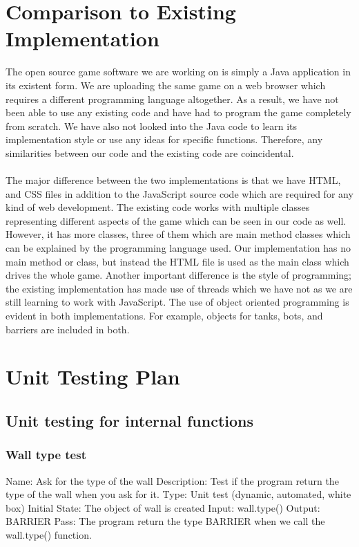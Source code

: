\documentclass{article}
\begin{document}
\section{Comparison to Existing Implementation}
The open source game software we are working on is simply a Java application 
in its existent form. We are uploading the same game on a web browser which 
requires a different programming language altogether. As a result, we have not 
been able to use any existing code and have had to program the game completely 
from scratch. We have also not looked into the Java code to learn its 
implementation style or use any ideas for specific functions. Therefore, any 
similarities between our code and the existing code are coincidental. \\ \\
The major difference between the two implementations is that we have HTML, and 
CSS files in addition to the JavaScript source code which are required for any 
kind of web development. The existing code works with multiple classes 
representing different aspects of the game which can be seen in our code as 
well. However, it has more classes, three of them which are main method 
classes which can be explained by the programming language used. Our 
implementation has no main method or class, but instead the HTML file is used 
as the main class which drives the whole game. Another important difference is 
the style of programming; the existing implementation has made use of threads 
which we have not as we are still learning to work with JavaScript. The use of 
object oriented programming is evident in both implementations. For example, 
objects for tanks, bots, and barriers are included in both. 





\section{Unit Testing Plan}
\subsection{Unit testing for internal functions}
\subsubsection{Wall type test}
Name:  Ask for the type of the wall\newline
Description: Test if the program return the type of the wall when you ask for 
it. \newline
Type: Unit test (dynamic, automated, white box) \newline
Initial State:  The object of wall is created \newline
Input: wall.type()\newline
Output: BARRIER  \newline
Pass:   The program return the type BARRIER when we call the wall.type() 
function. \newline
\end{document}
